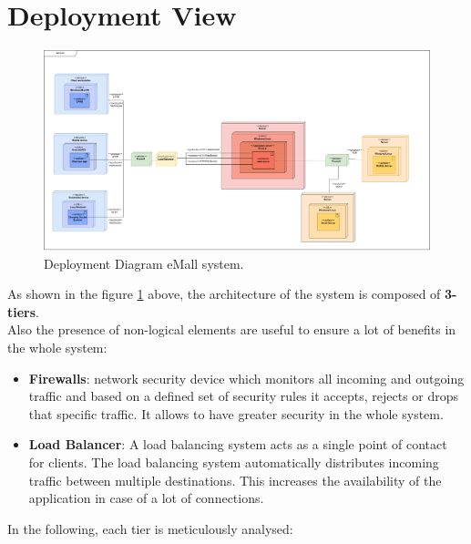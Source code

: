 \section{Deployment View}
\begin{figure}[H]
    \centering
    \includegraphics[width=\textwidth]{images/deployment.pdf}
    \caption{Deployment Diagram eMall system.}
    \label{fig:deployment_diagram}
\end{figure}
As shown in the figure \ref{fig:deployment_diagram} above, the architecture of the system is composed of \textbf{3-tiers}.\\
Also the presence of non-logical elements are useful to ensure a lot of benefits in the whole system:
\begin{itemize}
    \item \textbf{Firewalls}: network security device which monitors all incoming and outgoing traffic and based on a defined set of security rules it accepts, rejects or drops that specific traffic. It allows to have greater security in the whole system.
    \item \textbf{Load Balancer}: A load balancing system acts as a single point of contact for clients. The load balancing system automatically distributes incoming traffic between multiple destinations. This increases the availability of the application in case of a lot of connections.
\end{itemize}
In the following, each tier is meticulously analysed:
